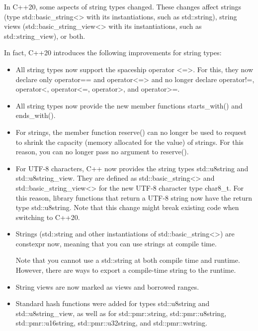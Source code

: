 
In C++20, some aspects of string types changed. These changes affect strings (type std::basic\_string<> with its instantiations, such as std::string), string views (std::basic\_string\_view<> with its instantiations, such as std::string\_view), or both.

In fact, C++20 introduces the following improvements for string types:

\begin{itemize}
\item 
All string types now support the spaceship operator <=>. For this, they now declare only operator== and operator<=> and no longer declare operator!=, operator<, operator<=, operator>, and operator>=.

\item 
All string types now provide the new member functions starts\_with() and ends\_with().

\item 
For strings, the member function reserve() can no longer be used to request to shrink the capacity (memory allocated for the value) of strings. For this reason, you can no longer pass no argument to reserve().

\item 
For UTF-8 characters, C++ now provides the string types std::u8string and std::u8string\_view. They are defined as std::basic\_string<> and std::basic\_string\_view<> for the new UTF-8 character type char8\_t. For this reason, library functions that return a UTF-8 string now have the return type std::u8string. Note that this change might break existing code when switching to C++20.

\item 
Strings (std::string and other instantiations of std::basic\_string<>) are constexpr now, meaning that you can use strings at compile time.

Note that you cannot use a std::string at both compile time and runtime. However, there are ways to export a compile-time string to the runtime.

\item 
String views are now marked as views and borrowed ranges.

\item 
Standard hash functions were added for types std::u8string and std::u8string\_view, as well as for std::pmr::string, std::pmr::u8string, std::pmr::u16string, std::pmr::u32string, and std::pmr::wstring.
\end{itemize}

